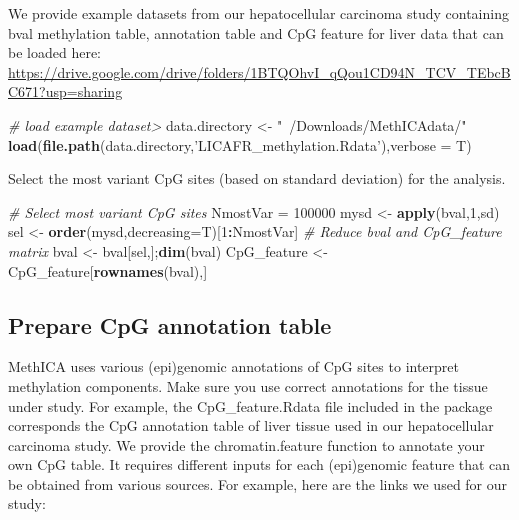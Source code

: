 \documentclass[]{article}
\newenvironment{Shaded}{\begin{snugshade}}{\end{snugshade}}
\newcommand{\CommentTok}[1]{\textcolor[rgb]{0.56,0.35,0.01}{\textit{#1}}}
\newcommand{\DataTypeTok}[1]{\textcolor[rgb]{0.13,0.29,0.53}{#1}}
\newcommand{\DecValTok}[1]{\textcolor[rgb]{0.00,0.00,0.81}{#1}}
\newcommand{\KeywordTok}[1]{\textcolor[rgb]{0.13,0.29,0.53}{\textbf{#1}}}
\newcommand{\NormalTok}[1]{#1}
\newcommand{\OperatorTok}[1]{\textcolor[rgb]{0.81,0.36,0.00}{\textbf{#1}}}
\newcommand{\StringTok}[1]{\textcolor[rgb]{0.31,0.60,0.02}{#1}}
\begin{document}
We provide example datasets from our hepatocellular carcinoma study
containing bval methylation table, annotation table and CpG feature for
liver data that can be loaded here:
\url{https://drive.google.com/drive/folders/1BTQOhvI_qQou1CD94N_TCV_TEbcBC671?usp=sharing}

\begin{Shaded}
\begin{Highlighting}[]
\CommentTok{# load example dataset> }
\NormalTok{data.directory <-}\StringTok{ "~/Downloads/MethICAdata/"}
\KeywordTok{load}\NormalTok{(}\KeywordTok{file.path}\NormalTok{(data.directory,}\StringTok{'LICAFR_methylation.Rdata'}\NormalTok{),}\DataTypeTok{verbose =}\NormalTok{ T)}
\end{Highlighting}
\end{Shaded}

Select the most variant CpG sites (based on standard deviation) for the
analysis.

\begin{Shaded}
\begin{Highlighting}[]
\CommentTok{# Select most variant CpG sites }
\NormalTok{NmostVar =}\StringTok{ }\DecValTok{100000}
\NormalTok{mysd <-}\StringTok{ }\KeywordTok{apply}\NormalTok{(bval,}\DecValTok{1}\NormalTok{,sd)}
\NormalTok{sel <-}\StringTok{ }\KeywordTok{order}\NormalTok{(mysd,}\DataTypeTok{decreasing=}\NormalTok{T)[}\DecValTok{1}\OperatorTok{:}\NormalTok{NmostVar]}
\CommentTok{# Reduce bval and CpG_feature matrix}
\NormalTok{bval <-}\StringTok{ }\NormalTok{bval[sel,];}\KeywordTok{dim}\NormalTok{(bval)}
\NormalTok{CpG_feature <-}\StringTok{ }\NormalTok{CpG_feature[}\KeywordTok{rownames}\NormalTok{(bval),]}
\end{Highlighting}
\end{Shaded}

\hypertarget{prepare-cpg-annotation-table}{%
\subsection{Prepare CpG annotation
table}\label{prepare-cpg-annotation-table}}

MethICA uses various (epi)genomic annotations of CpG sites to interpret
methylation components. Make sure you use correct annotations for the
tissue under study. For example, the CpG\_feature.Rdata file included in
the package corresponds the CpG annotation table of liver tissue used in
our hepatocellular carcinoma study. We provide the chromatin.feature
function to annotate your own CpG table. It requires different inputs
for each (epi)genomic feature that can be obtained from various sources.
For example, here are the links we used for our study:
\end{document}
